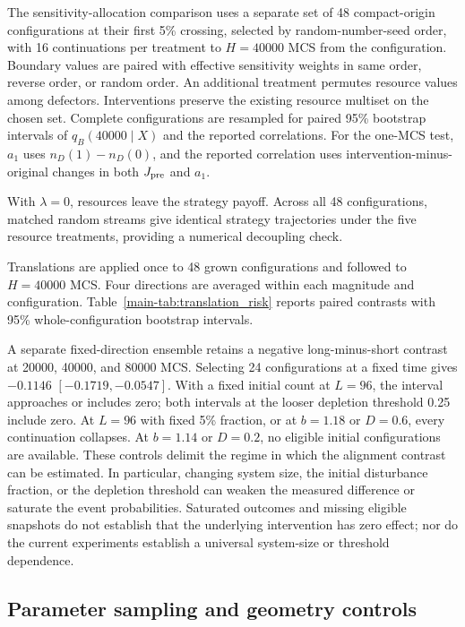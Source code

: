 The sensitivity-allocation comparison uses a separate set of 48 compact-origin configurations at their first 5\% crossing, selected by random-number-seed order, with 16 continuations per treatment to $H=40000$ MCS from the configuration. Boundary values are paired with effective sensitivity weights in same order, reverse order, or random order. An additional treatment permutes resource values among defectors. Interventions preserve the existing resource multiset on the chosen set. Complete configurations are resampled for paired 95\% bootstrap intervals of $q_B(40000\mid X)$ and the reported correlations. For the one-MCS test, $a_1$ uses $n_D(1)-n_D(0)$, and the reported correlation uses intervention-minus-original changes in both $J_{\rm pre}$ and $a_1$.

With $\lambda=0$, resources leave the strategy payoff. Across all 48 configurations, matched random streams give identical strategy trajectories under the five resource treatments, providing a numerical decoupling check.

Translations are applied once to 48 grown configurations and followed to $H=40000$ MCS. Four directions are averaged within each magnitude and configuration. Table~\ref{main-tab:translation_risk} reports paired contrasts with 95\% whole-configuration bootstrap intervals.

A separate fixed-direction ensemble retains a negative long-minus-short contrast at 20000, 40000, and 80000 MCS. Selecting 24 configurations at a fixed time gives $-0.1146$ $[-0.1719,-0.0547]$. With a fixed initial count at $L=96$, the interval approaches or includes zero; both intervals at the looser depletion threshold 0.25 include zero. At $L=96$ with fixed 5\% fraction, or at $b=1.18$ or $D=0.6$, every continuation collapses. At $b=1.14$ or $D=0.2$, no eligible initial configurations are available. These controls delimit the regime in which the alignment contrast can be estimated. In particular, changing system size, the initial disturbance fraction, or the depletion threshold can weaken the measured difference or saturate the event probabilities. Saturated outcomes and missing eligible snapshots do not establish that the underlying intervention has zero effect; nor do the current experiments establish a universal system-size or threshold dependence.

\subsection{Parameter sampling and geometry controls}

